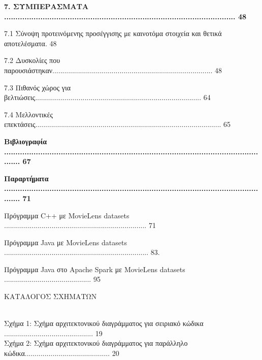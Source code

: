 \documentclass{report}
\begin{document}
\begin{list}
\textbf{7. ΣΥΜΠΕΡΑΣΜΑΤΑ ...................................................................................................... 48}
   \vspace{2mm} 
    \item{7.1  Σύνοψη προτεινόμενης προσέγγισης με καινοτόμα στοιχεία και θετικά αποτελέσματα. 48}
    \item{7.2 Δυσκολίες που παρουσιάστηκαν................................................................................. 48}
    \item{7.3 Πιθανός χώρος για βελτιώσεις.................................................................................... 64}
    \item{7.4 Μελλοντικές επεκτάσεις.............................................................................................. 65}
    \vspace{5mm}
\end{list}

\begin{list}
\textbf{Βιβλιογραφία ....................................................................................................................... 67}
\item{}
\end{list}

\begin{list}
\textbf{Παραρτήματα ....................................................................................................................... 71}
\item{Πρόγραμμα \textlatin{C++} με \textlatin{MovieLens datasets} ........................................................................ 71}
\item{Πρόγραμμα \textlatin{Java} με \textlatin{MovieLens datasets} ......................................................................... 83}.
\item{Πρόγραμμα \textlatin{Java} στο \textlatin{Apache Spark} με \textlatin{MovieLens datasets} ............................................ 95}
\end{list}
\newpage

\begin{center}
\huge{ΚΑΤΑΛΟΓΟΣ ΣΧΗΜΑΤΩΝ}
\end{center}
\\
Σχήμα 1: Σχήμα αρχιτεκτονικού διαγράμματος για σειριακό κώδικα ............................................. 19
\\
Σχήμα 2: Σχήμα αρχιτεκτονικού διαγράμματος για παράλληλο κώδικα........................................... 20
\end{document}
